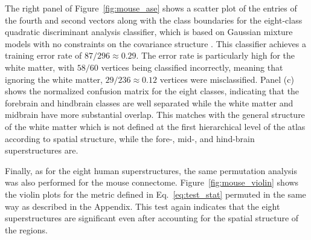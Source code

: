 \documentclass[journal,twoside,web]{ieeecolor}
\begin{document}
The right panel of Figure~\ref{fig:mouse_ase} shows a scatter plot of the entries of the fourth and second vectors along with the class boundaries for the eight-class quadratic discriminant analysis classifier, which is based on Gaussian mixture models with no constraints on the covariance structure \cite{Hastie2001-qi}.
This classifier achieves a training error rate of $87/296\approx 0.29$.
The error rate is particularly high for the white matter, with $58/60$ vertices being classified incorrectly, meaning that ignoring the white matter, $29/236 \approx 0.12$ vertices were misclassified. 
Panel (c) shows the normalized confusion matrix for the eight classes, indicating that the forebrain and hindbrain classes are well separated while the white matter and midbrain have more substantial overlap.
This matches with the general structure of the white matter which is not defined at the first hierarchical level of the atlas according to spatial structure, while the fore-, mid-, and hind-brain superstructures are.


Finally, as for the eight human superstructures, the same permutation analysis was also performed for the mouse connectome.
Figure~\ref{fig:mouse_violin} shows the violin plots for the metric defined in Eq.~\eqref{eq:test_stat} permuted in the same way as described in the Appendix.
This test again indicates that the eight superstructures are significant even after accounting for the spatial structure of the regions.
\end{document}

